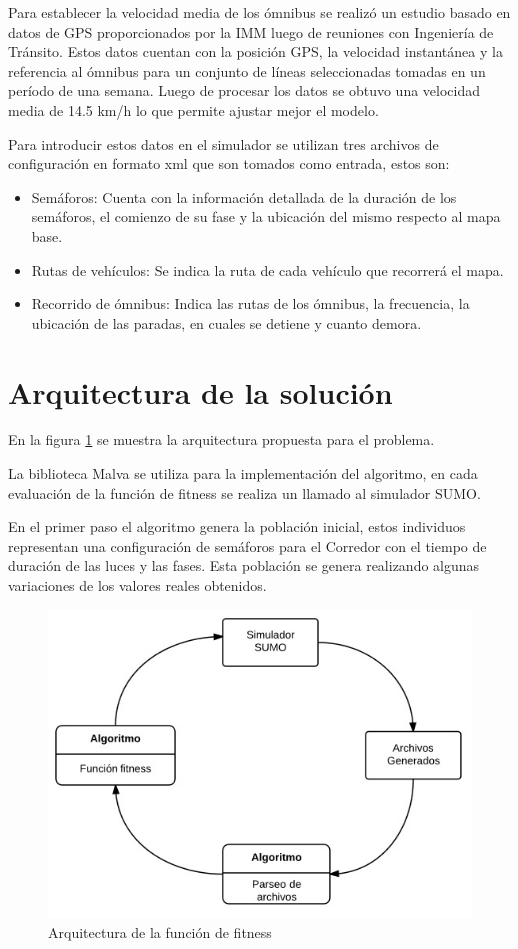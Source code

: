 Para establecer la velocidad media de los ómnibus se realizó un estudio basado en datos de GPS proporcionados por la IMM luego de reuniones con Ingeniería de Tránsito.
Estos datos cuentan con la posición GPS, la velocidad instantánea y la referencia al ómnibus para un conjunto de líneas seleccionadas tomadas en un período de una semana. Luego de procesar los datos se obtuvo una velocidad media de 14.5 km/h lo que permite ajustar mejor el modelo. 

Para introducir estos datos en el simulador se utilizan tres archivos de configuración en formato xml que son tomados como entrada, estos son:

\begin{itemize}
	\item Semáforos: Cuenta con la información detallada de la duración de los semáforos, el comienzo de su fase y la ubicación del mismo respecto al mapa base.
	\item Rutas de vehículos: Se indica la ruta de cada vehículo que recorrerá el mapa.
	\item Recorrido de ómnibus: Indica las rutas de los ómnibus, la frecuencia, la ubicación de las paradas, en cuales se detiene y cuanto demora.
\end{itemize}




\section{Arquitectura de la solución}

En la figura \ref{fig:arquitectura1} se muestra la arquitectura propuesta para el problema.

La biblioteca Malva se utiliza para la implementación del algoritmo, en cada evaluación de la función de fitness se realiza un llamado al simulador SUMO. 

En el primer paso el algoritmo genera la población inicial, estos individuos representan una configuración de semáforos para el Corredor con el tiempo de duración de las luces y las fases. Esta población se genera realizando algunas variaciones de los valores reales obtenidos.

\begin{figure}[H]
	\centering
	\includegraphics[width=0.7\linewidth]{Figures/arquitectura1}
	\caption{Arquitectura de la función de fitness}
	\label{fig:arquitectura1}
\end{figure}

